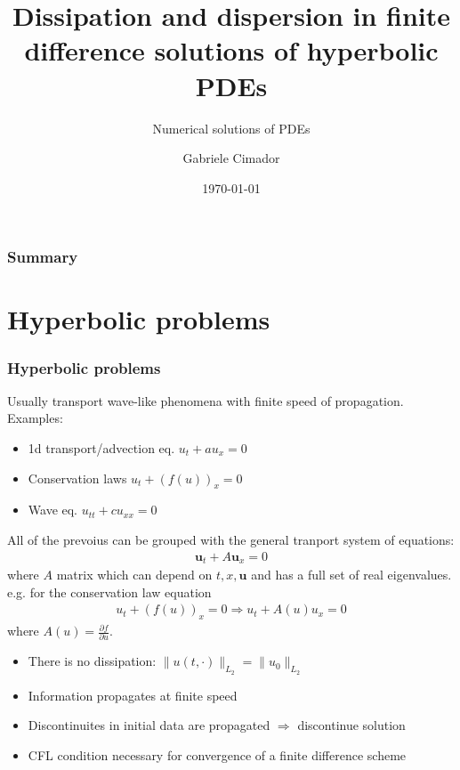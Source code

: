 \documentclass{beamer}
\title{Dissipation and dispersion in finite difference solutions of hyperbolic PDEs}
\subtitle{Numerical solutions of PDEs}
\author{Gabriele Cimador}
\institute{Data Science and Scientific computing at Università di Trieste}
\date{\today}
\begin{document}
\begin{frame}
\titlepage
\end{frame}
\begin{frame}
\frametitle{Summary}
\tableofcontents
\end{frame}
\section{Hyperbolic problems}
\begin{frame}
\frametitle{Hyperbolic problems}
Usually transport wave-like phenomena with finite speed of propagation. Examples:
\begin{itemize}
\setlength\itemsep{1em}
  \item 1d transport/advection eq. $u_t + a u_x = 0$
  \item Conservation laws $u_t + (f(u))_x = 0$
  \item Wave eq. $u_{tt} + cu_{xx} = 0$
\end{itemize}
\cite{doi:10.1137/1.9780898718911}

\end{frame}
\begin{frame}
All of the prevoius can be grouped with the general tranport system of equations:
\begin{align*}
\bm{u}_t + A\bm{u}_x = 0
\end{align*}
where $A$ matrix which can depend on $t, x, \bm{u}$ and has a full set of real eigenvalues.
\\ e.g. for the conservation law equation
\begin{align*}
u_t + (f(u))_x = 0 \Rightarrow u_t + A(u)u_x = 0
\end{align*}
 where $A(u) = \frac{\partial f}{\partial u}$.
\end{frame}
\begin{frame}
\begin{itemize}
  \item There is no dissipation: $\lVert u(t,\cdot) \rVert_{L_2} = \lVert u_0\rVert_{L_2}$
  \item Information propagates at finite speed
  \item Discontinuites in initial data are propagated $\Rightarrow$ discontinue solution
  \item CFL condition necessary for convergence of a finite difference scheme
\end{itemize}
\end{frame}
\end{document}
